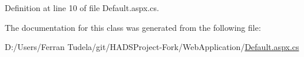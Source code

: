 Definition at line 10 of file Default.\+aspx.\+cs.



The documentation for this class was generated from the following file\+:\begin{DoxyCompactItemize}
\item 
D\+:/\+Users/\+Ferran Tudela/git/\+H\+A\+D\+S\+Project-\/\+Fork/\+Web\+Application/\mbox{\hyperlink{Default_8aspx_8cs}{Default.\+aspx.\+cs}}\end{DoxyCompactItemize}
